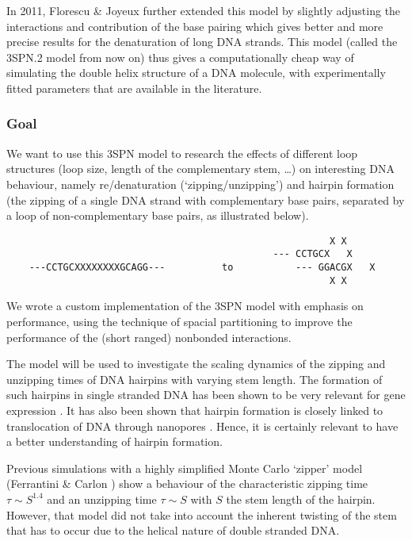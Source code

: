 In 2011, Florescu \& Joyeux \cite{florescu2011thermal} further extended this model by slightly adjusting the interactions and contribution of the base pairing which gives better and more precise results for the denaturation of long DNA strands. This model (called the 3SPN.2 model from now on) thus gives a computationally cheap way of simulating the double helix structure of a DNA molecule, with experimentally fitted parameters that are available in the literature.



\subsubsection*{Goal}

We want to use this 3SPN model to research the effects of different loop structures (loop size, length of the complementary stem, \ldots) on interesting DNA behaviour, namely re/denaturation (`zipping/unzipping') and hairpin formation (the zipping of a single DNA strand with complementary base pairs, separated by a loop of non-complementary base pairs, as illustrated below).
\begin{verbatim}
                                                         X X
                                               --- CCTGCX   X
    ---CCTGCXXXXXXXXGCAGG---	      to           --- GGACGX   X
                                                         X X
\end{verbatim}We wrote a custom implementation of the 3SPN model with emphasis on performance, using the technique of spacial partitioning \cite{plimpton1995fast} to improve the performance of the (short ranged) nonbonded interactions.

The model will be used to investigate the scaling dynamics of the zipping and unzipping times of DNA hairpins with varying stem length. The formation of such hairpins in single stranded DNA has been shown to be very relevant for gene expression \cite{oettinger2000hairpins}. It has also been shown that hairpin formation is closely linked to translocation of DNA through nanopores \cite{carlon2011anomalous}. Hence, it is certainly relevant to have a better understanding of hairpin formation.

Previous simulations with a highly simplified Monte Carlo `zipper' model (Ferrantini \& Carlon \cite{carlon2011anomalous}) show a behaviour of the characteristic zipping time $\tau \sim S^{1.4}$ and an unzipping time $\tau \sim S$ with $S$ the stem length of the hairpin. However, that model did not take into account the inherent twisting of the stem that has to occur due to the helical nature of double stranded DNA.

